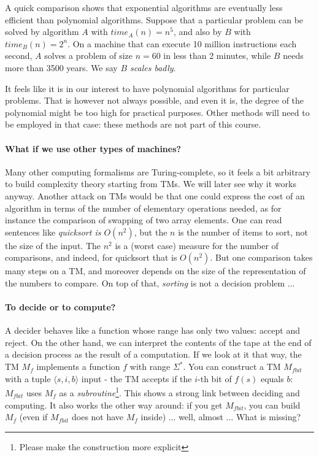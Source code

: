 A quick comparison shows that exponential algorithms are eventually
less efficient than polynomial algorithms. Suppose that a particular
problem can be solved by algorithm $A$ with $time_A(n)=n^5$, and also
by $B$ with $time_B(n)=2^n$. On a machine that can execute 10 million
instructions each second, $A$ solves a problem of size $n=60$ in
less than 2 minutes, while $B$ needs more than 3500 years. We say {\em
$B$ scales badly}.

It feels like it is in our interest to have polynomial algorithms for
particular problems. That is however not always possible, and even it
is, the degree of the polynomial might be too high for practical
purposes. Other methods will need to be employed in that case: these
methods are not part of this course.



\paragraph{What if we use other types of machines?} Many other
computing formalisms are Turing-complete, so it feels a bit arbitrary
to build complexity theory starting from TMs. We will later see why it
works anyway. Another attack on TMs would be that one could express
the cost of an algorithm in terms of the number of elementary
operations needed, as for instance the comparison of swapping of two
array elements. One can read sentences like {\em quicksort is
$O(n^2)$}, but the $n$ is the number of items to sort, not the size of
the input. The $n^2$ is a (worst case) measure for the number of
comparisons, and indeed, for quicksort that is $O(n^2)$. But one
comparison takes many steps on a TM, and moreover depends on the size
of the representation of the numbers to compare. On top of that, {\em
sorting} is not a decision problem ...


\paragraph{To decide or to compute?}

A decider behaves like a function whose range has only two values:
accept and reject. On the other hand, we can interpret the contents
of the tape at the end of a decision process as the result of a
computation. If we look at it that way, the TM $M_f$ implements a
function $f$ with range $\Sigma^*$. You can construct a TM $M_{fbit}$
with a tuple $\langle s,i,b \rangle$ input - the TM accepts if the
$i$-th bit of $f(s)$ equals $b$: $M_{fbit}$ uses $M_f$ as a {\em
subroutine}\footnote{Please make the construction more explicit}. This
shows a strong link between deciding and computing. It also works the
other way around: if you get $M_{fbit}$, you can build $M_f$ (even if
$M_{fbit}$ does not have $M_f$ inside) ... well, almost ... What is
missing?


